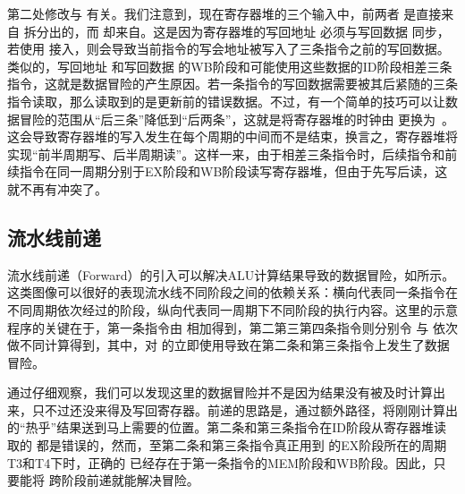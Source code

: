 第二处修改与 有关。我们注意到，现在寄存器堆的三个输入中，前两者 是直接来自 拆分出的，而 却来自。这是因为寄存器堆的写回地址 必须与写回数据 同步，若使用 接入，则会导致当前指令的写会地址被写入了三条指令之前的写回数据。类似的，写回地址 和写回数据 的WB阶段和可能使用这些数据的ID阶段相差三条指令，这就是数据冒险的产生原因。若一条指令的写回数据需要被其后紧随的三条指令读取，那么读取到的是更新前的错误数据。不过，有一个简单的技巧可以让数据冒险的范围从“后三条”降低到“后两条”，这就是将寄存器堆的时钟由 更换为\ \texttt{}。这会导致寄存器堆的写入发生在每个周期的中间而不是结束，换言之，寄存器堆将实现“前半周期写、后半周期读”。这样一来，由于相差三条指令时，后续指令和前续指令在同一周期分别于EX阶段和WB阶段读写寄存器堆，但由于先写后读，这就不再有冲突了。


\subsection{流水线前递}
流水线前递（Forward）的引入可以解决ALU计算结果导致的数据冒险，如所示。这类图像可以很好的表现流水线不同阶段之间的依赖关系：横向代表同一条指令在不同周期依次经过的阶段，纵向代表同一周期下不同阶段的执行内容。这里的示意程序的关键在于，第一条指令由 相加得到，第二第三第四条指令则分别令 与 依次做不同计算得到，其中，对 的立即使用导致在第二条和第三条指令上发生了数据冒险。

通过仔细观察，我们可以发现这里的数据冒险并不是因为结果没有被及时计算出来，只不过还没来得及写回寄存器。前递的思路是，通过额外路径，将刚刚计算出的“热乎”结果送到马上需要的位置。第二条和第三条指令在ID阶段从寄存器堆读取的 都是错误的，然而，至第二条和第三条指令真正用到 的EX阶段所在的周期T3和T4下时，正确的 已经存在于第一条指令的MEM阶段和WB阶段。因此，只要能将 跨阶段前递就能解决冒险。

